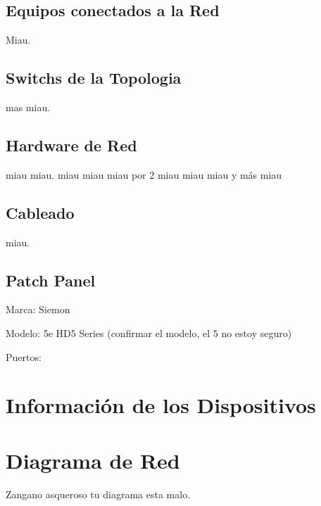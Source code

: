 \documentclass[spanish]{udpreport}
\begin{document}
\section{Equipos conectados a la Red}
Miau.

\section{Switchs de la Topologia}
mas miau.

\section{Hardware de Red}
miau miau.
miau miau miau por 2
miau miau miau y más miau
\section{Cableado}
miau.

\section{Patch Panel}
Marca: Siemon

Modelo: 5e HD5 Series (confirmar el modelo, el 5 no estoy seguro)

Puertos:

\chapter{Información de los Dispositivos}

\chapter{Diagrama de Red}
Zangano asqueroso tu diagrama esta malo.

\listoffigures
\end{document}
